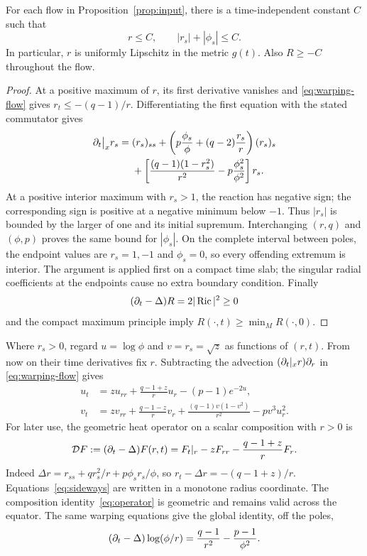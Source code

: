 \begin{lemma}\label{lem:gradients}
For each flow in Proposition~\ref{prop:input}, there is a time-independent
constant \(C\) such that
\[
r\le C,\qquad |r_s|+|\phi_s|\le C.
\]
In particular, \(r\) is uniformly Lipschitz in the metric \(g(t)\).
Also \(R\ge-C\) throughout the flow.
\end{lemma}

\begin{proof}
At a positive maximum of \(r\), its first derivative vanishes and
\eqref{eq:warping-flow} gives \(r_t\le-(q-1)/r\).
Differentiating the first equation with the stated commutator gives
\begin{equation}\label{eq:slope-flow}
\begin{split}
\partial_t\big|_x r_s={}&(r_s)_{ss}
 +\left(p\frac{\phi_s}{\phi}+(q-2)\frac{r_s}{r}\right)(r_s)_s\\
&+\left[\frac{(q-1)(1-r_s^2)}{r^2}
       -p\frac{\phi_s^2}{\phi^2}\right]r_s.
\end{split}
\end{equation}
At a positive interior maximum with \(r_s>1\), the reaction has negative
sign; the corresponding sign is positive at a negative minimum below
\(-1\). Thus \(|r_s|\) is bounded by the larger of one and its initial
supremum. Interchanging \((r,q)\) and \((\phi,p)\) proves the same bound
for \(|\phi_s|\). On the complete interval between poles, the endpoint
values are \(r_s=1,-1\) and \(\phi_s=0\), so every offending extremum is
interior. The argument is applied first on a compact time slab; the
singular radial coefficients at the endpoints cause no extra boundary
condition. Finally
\[
(\partial_t-\Delta)R=2|\operatorname{Ric}|^2\ge0
\]
and the compact maximum principle imply
\(R(\cdot,t)\ge\min_M R(\cdot,0)\).
\end{proof}

Where \(r_s>0\), regard \(u=\log\phi\) and \(v=r_s=\sqrt z\) as functions
of \((r,t)\). From now on their time derivatives fix \(r\).
Subtracting the advection \((\partial_t|_x r)\partial_r\) in
\eqref{eq:warping-flow} gives
\begin{equation}\label{eq:sideways}
\begin{aligned}
u_t&=zu_{rr}+\frac{q-1+z}{r}u_r-(p-1)e^{-2u},\\
v_t&=zv_{rr}+\frac{q-1-z}{r}v_r
       +\frac{(q-1)v(1-v^2)}{r^2}-pv^3u_r^2.
\end{aligned}
\end{equation}
For later use, the geometric heat operator on a scalar composition with
\(r>0\) is
\begin{equation}\label{eq:operator}
\mathcal D F:= (\partial_t-\Delta)F(r,t)
=F_t|_r-zF_{rr}-\frac{q-1+z}{r}F_r.
\end{equation}
Indeed \(\Delta r=r_{ss}+q r_s^2/r+p\phi_s r_s/\phi\), so
\(r_t-\Delta r=-(q-1+z)/r\).
Equations~\eqref{eq:sideways} are written in a monotone radius coordinate.
The composition identity~\eqref{eq:operator} is geometric and remains valid
across the equator. The same warping equations give
the global identity, off the poles,
\begin{equation}\label{eq:ratio-heat}
(\partial_t-\Delta)\log(\phi/r)=\frac{q-1}{r^2}-\frac{p-1}{\phi^2}.
\end{equation}

